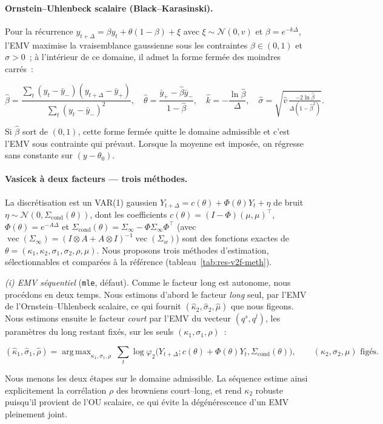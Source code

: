 \documentclass[11pt,a4paper]{article}
\theoremstyle{definition}
\DeclareMathOperator{\vecop}{vec}
\DeclareMathOperator*{\argmax}{arg\,max}
\newcommand{\Ncal}{\mathcal{N}}
\newcommand{\transp}{^{\!\top}}
\newcommand{\Dt}{\Delta}
\begin{document}
\paragraph{Ornstein--Uhlenbeck scalaire (Black--Karasinski).}
Pour la récurrence $y_{t+\Dt}=\beta y_t+\theta(1-\beta)+\xi$ avec $\xi\sim\Ncal(0,v)$ et $\beta=e^{-k\Dt}$, l'EMV maximise la vraisemblance gaussienne sous les contraintes $\beta\in(0,1)$ et $\sigma>0$~; à l'intérieur de ce domaine, il admet la forme fermée des moindres carrés~:
\begin{definitionbox}
\[
\hat\beta=\frac{\sum_t(y_t-\bar y_-)(y_{t+\Dt}-\bar y_+)}{\sum_t(y_t-\bar y_-)^2},\quad
\hat\theta=\frac{\bar y_+-\hat\beta\bar y_-}{1-\hat\beta},\quad
\hat k=-\frac{\ln\hat\beta}{\Dt},\quad
\hat\sigma=\sqrt{\hat v\,\tfrac{-2\ln\hat\beta}{\Dt(1-\hat\beta^2)}} .
\]
\end{definitionbox}
Si $\hat\beta$ sort de $(0,1)$, cette forme fermée quitte le domaine admissible et c'est l'EMV sous contrainte qui prévaut. Lorsque la moyenne est imposée, on régresse sans constante sur $(y-\theta_0)$.

\paragraph{Vasicek à deux facteurs --- trois méthodes.}
La discrétisation est un VAR(1) gaussien $Y_{t+\Dt}=c(\theta)+\Phi(\theta)Y_t+\eta$ de bruit $\eta\sim\Ncal(0,\Sigma_{\mathrm{cond}}(\theta))$, dont les coefficients $c(\theta)=(I-\Phi)(\mu,\mu)\transp$, $\Phi(\theta)=e^{-A\Dt}$ et $\Sigma_{\mathrm{cond}}(\theta)=\Sigma_\infty-\Phi\Sigma_\infty\Phi\transp$ (avec $\vecop(\Sigma_\infty)=(I\otimes A+A\otimes I)^{-1}\vecop(\Sigma_w)$) sont des fonctions exactes de $\theta=(\kappa_1,\kappa_2,\sigma_1,\sigma_2,\rho,\mu)$. Nous proposons trois méthodes d'estimation, sélectionnables et comparées à la référence (tableau~\ref{tab:res-v2f-meth}).

\emph{(i) EMV séquentiel} (\texttt{mle}, défaut). Comme le facteur long est autonome, nous procédons en deux temps. Nous estimons d'abord le facteur \emph{long} seul, par l'EMV de l'Ornstein--Uhlenbeck scalaire, ce qui fournit $(\hat\kappa_2,\hat\sigma_2,\hat\mu)$ que nous figeons. Nous estimons ensuite le facteur \emph{court} par l'EMV du vecteur $(q^s,q^l)$, les paramètres du long restant fixés, sur les seuls $(\kappa_1,\sigma_1,\rho)$~:
\begin{definitionbox}
\[
(\hat\kappa_1,\hat\sigma_1,\hat\rho)=\argmax_{\kappa_1,\sigma_1,\rho}\ \sum_t\log\varphi_2\big(Y_{t+\Dt};c(\theta)+\Phi(\theta)Y_t,\Sigma_{\mathrm{cond}}(\theta)\big),\qquad (\kappa_2,\sigma_2,\mu)\text{ figés}.
\]
\end{definitionbox}
Nous menons les deux étapes sur le domaine admissible. La séquence estime ainsi explicitement la corrélation $\rho$ des browniens court--long, et rend $\kappa_2$ robuste puisqu'il provient de l'OU scalaire, ce qui évite la dégénérescence d'un EMV pleinement joint.
\end{document}
